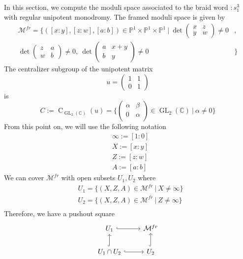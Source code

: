 \begin{example}
In this section, we compute the moduli space associated to the braid word $:s_1^3$ with regular unipotent monodromy. The framed moduli space is given by
\begin{align*}
	\mathcal{M}^{fr}=\{
	([x:y],[z:w],[a:b])\in \mathbb{P}^1 \times \mathbb{P}^1\times \mathbb{P}^1~|~
	\operatorname{det}
	\begin{pmatrix}
	x&z\\
	y&w
	\end{pmatrix}
	\neq 0&,\\
	\operatorname{det}
	\begin{pmatrix}
	z&a\\
	w&b
	\end{pmatrix}
	\neq 0,~
	\operatorname{det}
	\begin{pmatrix}
	a&x+y\\
	b&y
	\end{pmatrix}
	\neq 0&	 	
	\}
\end{align*}
The centralizer subgroup of the unipotent matrix
\[u=
	\begin{pmatrix}
		1&1\\
		0&1
	\end{pmatrix}
\] 
is
\[
	C:=\operatorname{C}_{\operatorname{GL}_2(\mathbb{C})}(u)=
	\{
	\begin{pmatrix}
	\alpha&\beta\\
	0&\alpha\\
	\end{pmatrix}
	\in \operatorname{GL}_2(\mathbb{C})~|~
	\alpha \neq 0
	\}
\]
From this point on, we will use the following notation 
\begin{align*}
 &\infty:=[1:0]\\
 &X:=[x:y]\\
 &Z:=[z:w]\\
 &A:=[a:b] 
\end{align*}
We can cover $\mathcal{M}^{fr}$ with open subsets $U_1,U_2$ where 
\begin{align*}
	&U_{1}=\{
	(X,Z,A)\in \mathcal{M}^{fr}~|~X\neq \infty\}\\
	&U_{2}=\{
	(X,Z,A)\in \mathcal{M}^{fr}~|~Z\neq \infty\}\\	
\end{align*}
Therefore, we have a pushout square
\begin{displaymath}
\begin{tikzcd}
  U_1\arrow[hookrightarrow]{r} & \mathcal{M}^{fr} \\
  U_1 \cap U_2 \arrow[hookrightarrow]{u} \arrow[r,hookrightarrow] & U_2 \arrow[hookrightarrow]{u} 

\end{tikzcd}
\end{displaymath}
\end{example}
